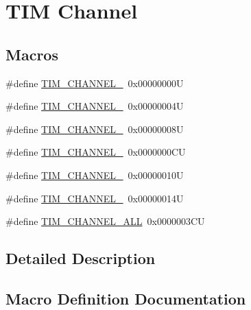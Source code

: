 \hypertarget{group___t_i_m___channel}{}\section{T\+IM Channel}
\label{group___t_i_m___channel}
\subsection*{Macros}
\begin{DoxyCompactItemize}
\item 
\#define \mbox{\hyperlink{group___t_i_m___channel_ga6b1541e4a49d62610899e24bf23f4879}{T\+I\+M\+\_\+\+C\+H\+A\+N\+N\+E\+L\+\_}}~0x00000000U
\item 
\#define \mbox{\hyperlink{group___t_i_m___channel_ga33e02d43345a7ac5886f01b39e4f7ccd}{T\+I\+M\+\_\+\+C\+H\+A\+N\+N\+E\+L\+\_}}~0x00000004U
\item 
\#define \mbox{\hyperlink{group___t_i_m___channel_ga4ea100c1789b178f3cb46721b7257e2d}{T\+I\+M\+\_\+\+C\+H\+A\+N\+N\+E\+L\+\_}}~0x00000008U
\item 
\#define \mbox{\hyperlink{group___t_i_m___channel_gad59ef74820ee8bf77fa1f8d589fde2ac}{T\+I\+M\+\_\+\+C\+H\+A\+N\+N\+E\+L\+\_}}~0x0000000\+CU
\item 
\#define \mbox{\hyperlink{group___t_i_m___channel_gae7a7e7ef775b2cce4dc5da3821c0703f}{T\+I\+M\+\_\+\+C\+H\+A\+N\+N\+E\+L\+\_}}~0x00000010U
\item 
\#define \mbox{\hyperlink{group___t_i_m___channel_gaf1042743f56a664b152ff0a03597807e}{T\+I\+M\+\_\+\+C\+H\+A\+N\+N\+E\+L\+\_}}~0x00000014U
\item 
\#define \mbox{\hyperlink{group___t_i_m___channel_ga6abf8f9fc695b79d8781ca082dfb48bc}{T\+I\+M\+\_\+\+C\+H\+A\+N\+N\+E\+L\+\_\+\+A\+LL}}~0x0000003\+CU
\end{DoxyCompactItemize}


\subsection{Detailed Description}


\subsection{Macro Definition Documentation}
\mbox{\label{group___t_i_m___channel_ga6b1541e4a49d62610899e24bf23f4879}} 
